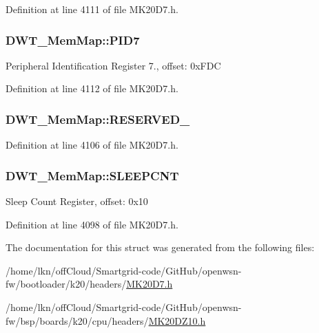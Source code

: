 Definition at line 4111 of file M\+K20\+D7.\+h.

\subsubsection[{\texorpdfstring{P\+I\+D7}{PID7}}]{ D\+W\+T\+\_\+\+Mem\+Map\+::\+P\+I\+D7}\hypertarget{struct_d_w_t___mem_map_af0158099ec07706eef6138a50643e1c8}{}\label{struct_d_w_t___mem_map_af0158099ec07706eef6138a50643e1c8}
Peripheral Identification Register 7., offset\+: 0x\+F\+DC 

Definition at line 4112 of file M\+K20\+D7.\+h.

\subsubsection[{\texorpdfstring{R\+E\+S\+E\+R\+V\+E\+D\+\_\+0}{RESERVED_0}}]{ D\+W\+T\+\_\+\+Mem\+Map\+::\+R\+E\+S\+E\+R\+V\+E\+D\+\_}\hypertarget{struct_d_w_t___mem_map_a16498665c59245cb4e8284c2eb224d8d}{}\label{struct_d_w_t___mem_map_a16498665c59245cb4e8284c2eb224d8d}


Definition at line 4106 of file M\+K20\+D7.\+h.

\subsubsection[{\texorpdfstring{S\+L\+E\+E\+P\+C\+NT}{SLEEPCNT}}]{ D\+W\+T\+\_\+\+Mem\+Map\+::\+S\+L\+E\+E\+P\+C\+NT}\hypertarget{struct_d_w_t___mem_map_a0c31354b6fe3f3dd79bc5b768bea4f46}{}\label{struct_d_w_t___mem_map_a0c31354b6fe3f3dd79bc5b768bea4f46}
Sleep Count Register, offset\+: 0x10 

Definition at line 4098 of file M\+K20\+D7.\+h.



The documentation for this struct was generated from the following files\+:\begin{DoxyCompactItemize}
\item 
/home/lkn/off\+Cloud/\+Smartgrid-\/code/\+Git\+Hub/openwsn-\/fw/bootloader/k20/headers/\hyperlink{bootloader_2k20_2headers_2_m_k20_d7_8h}{M\+K20\+D7.\+h}\item 
/home/lkn/off\+Cloud/\+Smartgrid-\/code/\+Git\+Hub/openwsn-\/fw/bsp/boards/k20/cpu/headers/\hyperlink{_m_k20_d_z10_8h}{M\+K20\+D\+Z10.\+h}\end{DoxyCompactItemize}
